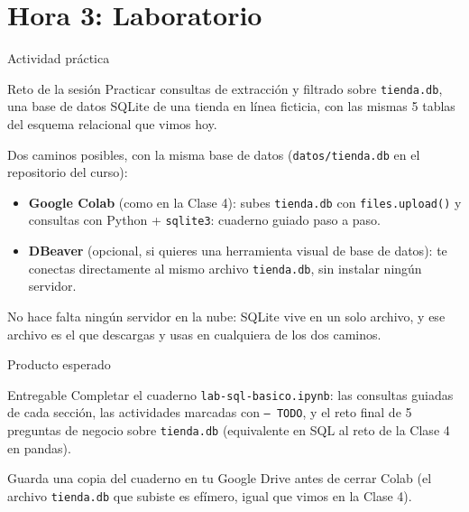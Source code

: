 \documentclass[aspectratio=169,11pt]{beamer}
\begin{document}
\section{Hora 3: Laboratorio}
\begin{frame}{Actividad práctica}
  \begin{alertblock}{Reto de la sesión}
    \small Practicar consultas de extracción y filtrado sobre
    \texttt{tienda.db}, una base de datos SQLite de una tienda en línea
    ficticia, con las mismas 5 tablas del esquema relacional que vimos hoy.
  \end{alertblock}
  \vspace{0.2cm}
  \small Dos caminos posibles, con la misma base de datos (\texttt{datos/tienda.db} en el repositorio del curso):
  \begin{itemize}
    \small
    \item \textbf{Google Colab} (como en la Clase 4): subes
      \texttt{tienda.db} con \texttt{files.upload()} y consultas con
      Python + \texttt{sqlite3}: cuaderno guiado paso a paso.
    \item \textbf{DBeaver} (opcional, si quieres una herramienta visual de
      base de datos): te conectas directamente al mismo archivo
      \texttt{tienda.db}, sin instalar ningún servidor.
  \end{itemize}
  \small No hace falta ningún servidor en la nube: SQLite vive en un solo
  archivo, y ese archivo es el que descargas y usas en cualquiera de los
  dos caminos.
\end{frame}

\begin{frame}{Producto esperado}
  \begin{exampleblock}{Entregable}
    \small Completar el cuaderno \texttt{lab-sql-basico.ipynb}: las
    consultas guiadas de cada sección, las actividades marcadas con
    \texttt{-- TODO}, y el reto final de 5 preguntas de negocio sobre
    \texttt{tienda.db} (equivalente en SQL al reto de la Clase 4 en
    pandas).
  \end{exampleblock}
  \small Guarda una copia del cuaderno en tu Google Drive antes de cerrar
  Colab (el archivo \texttt{tienda.db} que subiste es efímero, igual que
  vimos en la Clase 4).
\end{frame}

\end{document}
